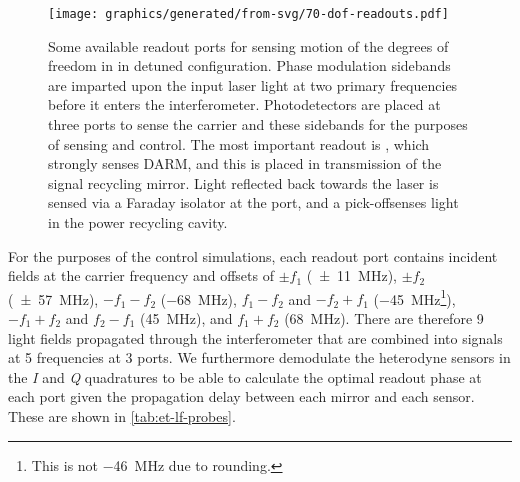 \begin{figure}
  \centering
  \texttt{[image: graphics/generated/from-svg/70-dof-readouts.pdf]}
  \caption[Some available readout ports for sensing and control in \ETLF{} in detuned configuration]{\label{fig:dof-readouts}Some available readout ports for sensing motion of the degrees of freedom in \ETLF{} in detuned configuration. Phase modulation sidebands are imparted upon the input laser light at two primary frequencies before it enters the interferometer. Photodetectors are placed at three ports to sense the carrier and these sidebands for the purposes of sensing and control. The most important readout is \AS{}, which strongly senses \gls{DARM}, and this is placed in transmission of the signal recycling mirror. Light reflected back towards the laser is sensed via a Faraday isolator at the \REFL{} port, and a pick-off\textemdash \POP{}\textemdash senses light in the power recycling cavity.}
\end{figure}

For the purposes of the control simulations, each readout port contains incident fields at the carrier frequency and offsets of $\pm f_1$ (\SI{\pm11}{\mega\hertz}), $\pm f_2$ (\SI{\pm57}{\mega\hertz}), $-f_1 - f_2$ (\SI{-68}{\mega\hertz}), $f_1 - f_2$ and $-f_2 + f_1$ (\SI{-45}{\mega\hertz}\footnote{This is not \SI{-46}{\mega\hertz} due to rounding.}), $-f_1 + f_2$ and $f_2 - f_1$ (\SI{45}{\mega\hertz}), and $f_1 + f_2$ (\SI{68}{\mega\hertz}). There are therefore \num{9} light fields propagated through the interferometer that are combined into signals at \num{5} frequencies at \num{3} ports. We furthermore demodulate the heterodyne sensors in the \emph{I} and \emph{Q} quadratures to be able to calculate the optimal readout phase at each port given the propagation delay between each mirror and each sensor. These are shown in \cref{tab:et-lf-probes}.

